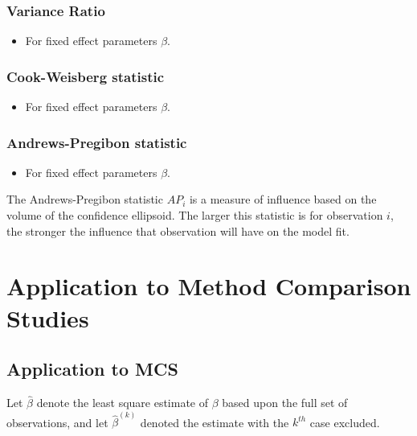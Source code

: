 \documentclass[12pt, a4paper]{report}
\theoremstyle{plain}
\theoremstyle{definition}
\theoremstyle{remark}
\begin{document}
\subsection{Variance Ratio} %
\begin{itemize}
\item For fixed effect parameters $\beta$.
\end{itemize}

\subsection{Cook-Weisberg statistic} %
\begin{itemize}
\item For fixed effect parameters $\beta$.
\end{itemize}

\subsection{Andrews-Pregibon statistic} %
\begin{itemize}
\item For fixed effect parameters $\beta$.
\end{itemize}
The Andrews-Pregibon statistic $AP_{i}$ is a measure of influence based on the volume of the confidence ellipsoid.
The larger this statistic is for observation $i$, the stronger the influence that observation will have on the model fit.






\chapter{Application to Method Comparison Studies} %

\section{Application to MCS}

Let $\hat{\beta}$ denote the least square estimate of $\beta$
based upon the full set of observations, and let
$\hat{\beta}^{(k)}$ denoted the estimate with the $k^{th}$ case
excluded.
\end{document}
